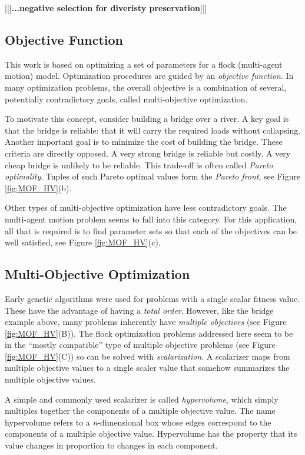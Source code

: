 \documentclass[letterpaper]{article}
\begin{document}
[[[\textbf{...negative selection for diveristy preservation}]]]

\subsection{Objective Function}
\label{subsec:ObjectiveFunction}

This work is based on optimizing a set of parameters for a flock (multi-agent motion) model. Optimization procedures are guided by an \textit{objective function}. In many optimization problems, the overall objective is a combination of several, potentially contradictory goals, called multi-objective optimization. 

To motivate this concept, consider building a bridge over a river. A key goal is that the bridge is reliable: that it will carry the required loads without collapsing. Another important goal is to minimize the cost of building the bridge. These criteria are directly opposed. A very strong bridge is reliable but costly. A very cheap bridge is unlikely to be reliable. This trade-off is often called \textit{Pareto optimality}. Tuples of such Pareto optimal values form the \textit{Pareto front}, see Figure \ref{fig:MOF_HV}(b).

Other types of multi-objective optimization have less contradictory goals. The multi-agent motion problem seems to fall into this category. For this application, all that is required is to find parameter sets so that each of the objectives can be well satisfied, see Figure \ref{fig:MOF_HV}(c).

\subsection{Multi-Objective Optimization}
\label{subsec:Multi-Objective}

Early genetic algorithms were used for problems with a single scalar fitness value. These have the advantage of having a \textit{total order}. However, like the bridge example above, many problems inherently have \textit{multiple objectives} (see Figure \ref{fig:MOF_HV}(B)). The flock optimization problems addressed here seem to be in the ``mostly compatible'' type of multiple objective problems (see Figure \ref{fig:MOF_HV}(C)) so can be solved with \textit{scalarization}. A scalarizer maps from multiple objective values to a single scaler value that somehow summarizes the multiple objective values.

A simple and commonly used scalarizer is called \textit{hypervolume}, which simply multiples together the components of a multiple objective value. The name hypervolume refers to a \textit{n}-dimensional box whose edges correspond to the components of a multiple objective value. Hypervolume has the property that its value changes in proportion to changes in each component.
\end{document}
